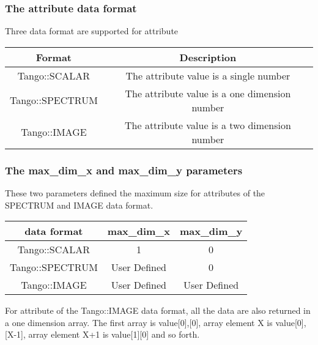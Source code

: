 \subsubsection{The attribute data format}

Three data format are supported for attribute

\vspace{0.3cm}

\begin{center}
\begin{longtable}{|c|c|}
\hline 
Format & Description\tabularnewline
\hline 
\hline 
Tango::SCALAR\index{SCALAR} & The attribute value is a single number\tabularnewline
\hline 
Tango::SPECTRUM\index{SPECTRUM} & The attribute value is a one dimension number\tabularnewline
\hline 
Tango::IMAGE\index{IMAGE} & The attribute value is a two dimension number\tabularnewline
\hline 
\end{longtable}
\par\end{center}

\vspace{0.3cm}


\subsubsection{The max\_dim\_x and max\_dim\_y
parameters}

These two parameters defined the maximum size for attributes of the
SPECTRUM and IMAGE data format.

\vspace{0.3cm}

\begin{center}
\begin{longtable}{|c|c|c|}
\hline 
data format & max\_dim\_x & max\_dim\_y\tabularnewline
\hline 
\hline 
Tango::SCALAR & 1 & 0\tabularnewline
\hline 
Tango::SPECTRUM & User Defined & 0\tabularnewline
\hline 
Tango::IMAGE & User Defined & User Defined\tabularnewline
\hline 
\end{longtable}
\par\end{center}

\vspace{0.3cm}

For attribute of the Tango::IMAGE data format, all the data are also
returned in a one dimension array. The first array is value{[}0{]},{[}0{]},
array element X is value{[}0{]},{[}X-1{]}, array element X+1 is value{[}1{]}{[}0{]}
and so forth.

